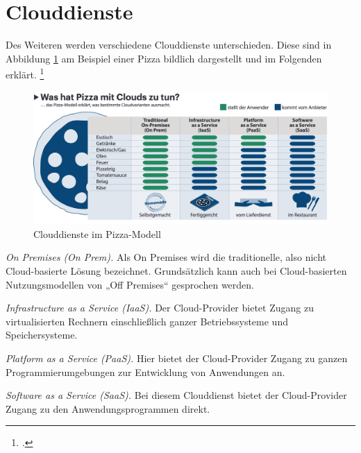 
\section{Clouddienste} %
\label{sec:Clouddienste}

Des Weiteren werden verschiedene Clouddienste unterschieden. Diese sind in Abbildung \ref{abb:PizzaModel} am Beispiel einer Pizza bildlich dargestellt und im Folgenden erklärt. \footcite[][]{Mell.2011}

\begin{figure}[htb]
	\centering
	\includegraphics[width=12cm]{graphics/PizzaModel.png}
  \caption[Clouddienste im Pizza-Modell]{Clouddienste im Pizza-Modell \footnotemark}
	\label{abb:PizzaModel}
\end{figure}

\begin{description}
  \item \emph{On Premises (On Prem).} Als On Premises wird die traditionelle, also nicht Cloud-basierte Lösung bezeichnet. Grundsätzlich kann auch bei Cloud-basierten Nutzungsmodellen von „Off Premises“ gesprochen werden.
  \item \emph{Infrastructure as a Service (IaaS).} Der Cloud-Provider bietet Zugang zu virtualisierten Rechnern einschließlich ganzer Betriebssysteme und Speichersysteme.
  \item \emph{Platform as a Service (PaaS).} Hier bietet der Cloud-Provider Zugang zu ganzen Programmierumgebungen zur Entwicklung von Anwendungen an.
  \item \emph{Software as a Service (SaaS).} Bei diesem Clouddienst bietet der Cloud-Provider Zugang zu den Anwendungsprogrammen direkt.
\end{description}


